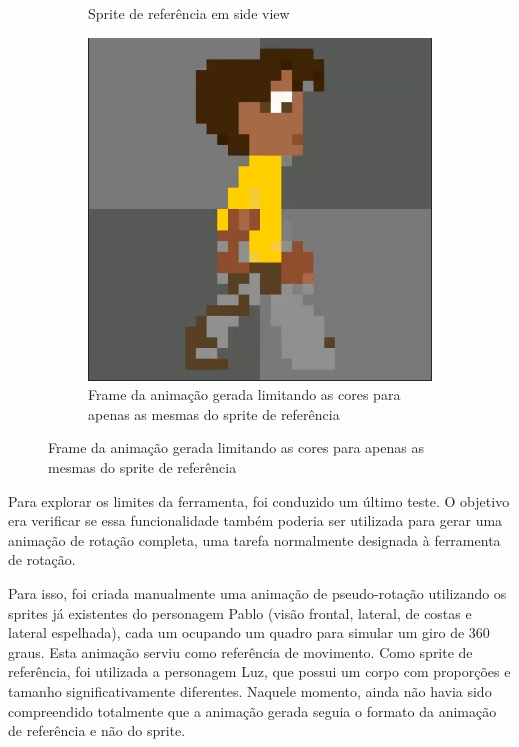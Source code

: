 \begin{figure}[htbp]
\begin{subfigure}{0.32\linewidth}
        \caption{\small Sprite de referência em side view}
        \label{fig:pixelLabAnimaComparaGeminiSprite2}
    \end{subfigure}
    \begin{subfigure}{0.32\linewidth}
        \includegraphics[width=1\linewidth]{figs/pixelLab/dia4/print6.PNG}
        \caption{\small Frame da animação gerada limitando as cores para apenas as mesmas do sprite de referência}
        \label{fig:pixelLabAnimaComparaGeminiGera2}
    \end{subfigure}
\end{figure}

Para explorar os limites da ferramenta, foi conduzido um último teste. O objetivo era verificar se essa funcionalidade também poderia ser utilizada para gerar uma animação de rotação completa, uma tarefa normalmente designada à ferramenta de rotação. 

Para isso, foi criada manualmente uma animação de pseudo-rotação utilizando os sprites já existentes do personagem Pablo (visão frontal, lateral, de costas e lateral espelhada), cada um ocupando um quadro para simular um giro de 360 graus. Esta animação serviu como referência de movimento. Como sprite de referência, foi utilizada a personagem Luz, que possui um corpo com proporções e tamanho significativamente diferentes. Naquele momento, ainda não havia sido compreendido totalmente que a animação gerada seguia o formato da animação de referência e não do sprite.

